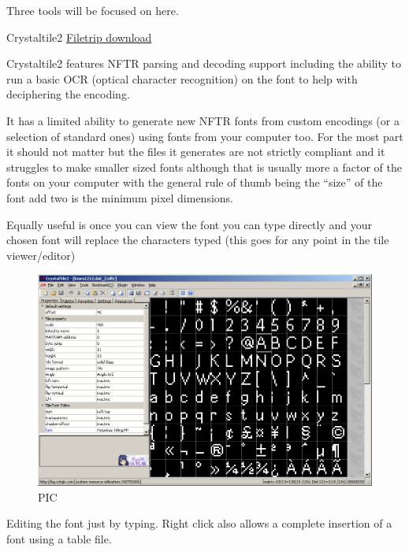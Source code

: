 \documentclass[
]{book}
\begin{document}
Three tools will be focused on here.

Crystaltile2 \href{http://filetrip.net/f23649-CrystalTile2-2010-09-06.html}{Filetrip download}

Crystaltile2 features NFTR parsing and decoding support including the ability to run a basic OCR (optical character recognition) on the font to help with deciphering the encoding.

It has a limited ability to generate new NFTR fonts from custom encodings (or a selection of standard ones) using fonts from your computer too. For the most part it should not matter but the files it generates are not strictly compliant and it struggles to make smaller sized fonts although that is usually more a factor of the fonts on your computer with the general rule of thumb being the ``size'' of the font add two is the minimum pixel dimensions.

Equally useful is once you can view the font you can type directly and your chosen font will replace the characters typed (this goes for any point in the tile viewer/editor)

\begin{figure}
\centering
\includegraphics{images/110_home_fast6191_romhackingguide_unrenamed_fil___rders_romhackingguidefontnftrcrystaltile2_1.png}
\caption{PIC}
\end{figure}

Editing the font just by typing. Right click also allows a complete insertion of a font using a table file.
\end{document}
